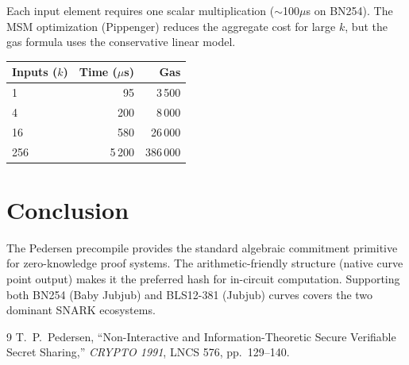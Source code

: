 \documentclass[11pt,a4paper]{article}
\begin{document}
Each input element requires one scalar multiplication ($\sim$100$\mu$s on BN254).
The MSM optimization (Pippenger) reduces the aggregate cost for large $k$, but
the gas formula uses the conservative linear model.

\begin{table}[H]
\centering
\begin{tabular}{lrr}
\toprule
\textbf{Inputs ($k$)} & \textbf{Time ($\mu$s)} & \textbf{Gas} \\
\midrule
1 & 95 & 3\,500 \\
4 & 200 & 8\,000 \\
16 & 580 & 26\,000 \\
256 & 5\,200 & 386\,000 \\
\bottomrule
\end{tabular}
\end{table}

\section{Conclusion}

The Pedersen precompile provides the standard algebraic commitment primitive for
zero-knowledge proof systems. The arithmetic-friendly structure (native curve
point output) makes it the preferred hash for in-circuit computation.
Supporting both BN254 (Baby Jubjub) and BLS12-381 (Jubjub) curves covers the
two dominant SNARK ecosystems.

\begin{thebibliography}{9}
  T.~P.~Pedersen, ``Non-Interactive and Information-Theoretic Secure Verifiable
  Secret Sharing,'' \textit{CRYPTO 1991}, LNCS 576, pp.~129--140.
\end{thebibliography}
\end{document}

